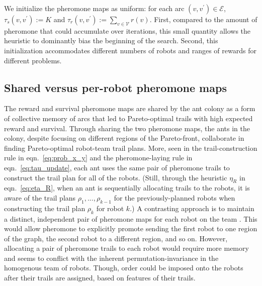 \documentclass[fleqn,10pt,lineno]{wlpeerj}
\begin{document}
We initialize the pheromone maps as uniform: for each arc $(v, v^\prime)\in\mathcal{E}$, $\tau_s(v, v^\prime) := K$ and $\tau_r(v, v^\prime) := \sum_{v \in \mathcal{V}} r(v)$. 
First, compared to the amount of pheromone that could accumulate over iterations, this small quantity allows the heuristic to dominantly bias the beginning of the search.
Second, this initialization accommodates different numbers of robots and ranges of rewards for different problems.

\subsection{Shared versus per-robot pheromone maps}
The reward and survival pheromone maps are shared by the ant colony as a form of collective memory of arcs that led to Pareto-optimal trails with high expected reward and survival. Through sharing the two pheromone maps, the ants in the colony, despite focusing on different regions of the Pareto-front, collaborate in finding Pareto-optimal robot-team trail plans.
More, seen in the trail-construction rule in eqn.~\ref{eq:prob_x_y} and the pheromone-laying rule in eqn.~\ref{eq:tau_update}, each ant uses the same pair of pheromone trails to construct the trail plan for all of the robots. (Still, through the heuristic $\eta_R$ in eqn.~\ref{eq:eta_R}, when an ant is sequentially allocating trails to the robots, it is aware of the trail plans $\rho_1, ..., \rho_{k-1}$ for the previously-planned robots when constructing the trail plan $\rho_k$ for robot $k$.)
A contrasting approach is to maintain a distinct, independent pair of pheromone maps for each robot on the team \cite{bell2004ant}. 
This would allow pheromone to explicitly promote sending the first robot to one region of the graph, the second robot to a different region, and so on. However, allocating a pair of pheromone trails to each robot would require more memory and seems to conflict with the inherent permutation-invariance in the homogenous team of robots. Though, order could be imposed onto the robots after their trails are assigned, based on features of their trails.
\end{document}
